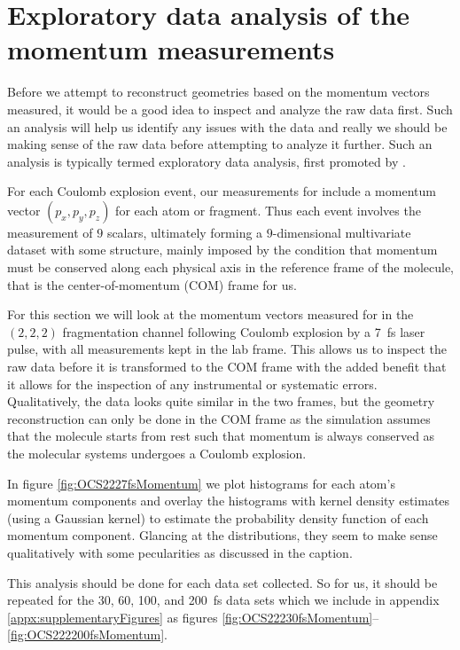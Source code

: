 \section{Exploratory data analysis of the momentum measurements}
Before we attempt to reconstruct geometries based on the momentum vectors measured, it would be a good idea to inspect and analyze the raw data first. Such an analysis will help us identify any issues with the data and really we should be making sense of the raw data before attempting to analyze it further. Such an analysis is typically termed exploratory data analysis, first promoted by \citet{Tukey77}.

For each Coulomb explosion event, our measurements for  include a momentum vector $(p_x, p_y, p_z)$ for each atom or fragment. Thus each event involves the measurement of $9$ scalars, ultimately forming a $9$-dimensional multivariate dataset with some structure, mainly imposed by the condition that momentum must be conserved along each physical axis in the reference frame of the molecule, that is the center-of-momentum (COM) frame for us.

For this section we will look at the momentum vectors measured for  in the $(2,2,2)$ fragmentation channel following Coulomb explosion by a \SI{7}{\fs} laser pulse, with all measurements kept in the lab frame. This allows us to inspect the raw data before it is transformed to the COM frame with the added benefit that it allows for the inspection of any instrumental or systematic errors. Qualitatively, the data looks quite similar in the two frames, but the geometry reconstruction can only be done in the COM frame as the simulation assumes that the molecule starts from rest such that momentum is always conserved as the molecular systems undergoes a Coulomb explosion.

In figure \ref{fig:OCS2227fsMomentum} we plot histograms for each atom's momentum components and overlay the histograms with kernel density estimates (using a Gaussian kernel) to estimate the probability density function of each momentum component. Glancing at the distributions, they seem to make sense qualitatively with some pecularities as discussed in the caption. 

This analysis should be done for each data set collected. So for us, it should be repeated for the 30, 60, 100, and \SI{200}{\fs} data sets which we include in appendix \ref{appx:supplementaryFigures} as figures \ref{fig:OCS22230fsMomentum}--\ref{fig:OCS222200fsMomentum}.

